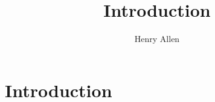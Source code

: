 \documentclass[12pt]{article}
\title{Introduction}
\author{Henry Allen}
\begin{document}
\maketitle

\section{Introduction}
    
\end{document}
